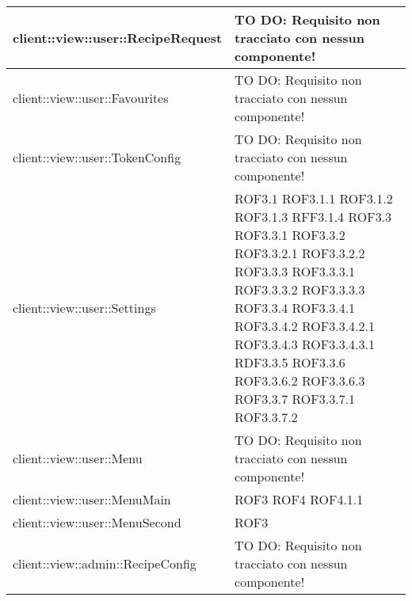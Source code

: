 \begin{center}
\begin{longtable}{| p{11cm} | p{2.5cm} |}
\hline
client::view::user::RecipeRequest & TO DO: Requisito non tracciato con nessun componente! \\
\hline
client::view::user::Favourites & TO DO: Requisito non tracciato con nessun componente! \\
\hline
client::view::user::TokenConfig & TO DO: Requisito non tracciato con nessun componente! \\
\hline
client::view::user::Settings & ROF3.1 \newline ROF3.1.1 \newline ROF3.1.2 \newline ROF3.1.3 \newline RFF3.1.4 \newline ROF3.3 \newline ROF3.3.1 \newline ROF3.3.2 \newline ROF3.3.2.1 \newline ROF3.3.2.2 \newline ROF3.3.3 \newline ROF3.3.3.1 \newline ROF3.3.3.2 \newline ROF3.3.3.3 \newline ROF3.3.4 \newline ROF3.3.4.1 \newline ROF3.3.4.2 \newline ROF3.3.4.2.1 \newline ROF3.3.4.3 \newline ROF3.3.4.3.1 \newline RDF3.3.5 \newline ROF3.3.6 \newline ROF3.3.6.2 \newline ROF3.3.6.3 \newline ROF3.3.7 \newline ROF3.3.7.1 \newline ROF3.3.7.2 \\
\hline
client::view::user::Menu & TO DO: Requisito non tracciato con nessun componente! \\
\hline
client::view::user::MenuMain & ROF3 \newline ROF4 \newline ROF4.1.1 \\
\hline
client::view::user::MenuSecond & ROF3 \\
\hline
client::view::admin::RecipeConfig & TO DO: Requisito non tracciato con nessun componente! \\
\hline

\end{longtable}
\end{center}
